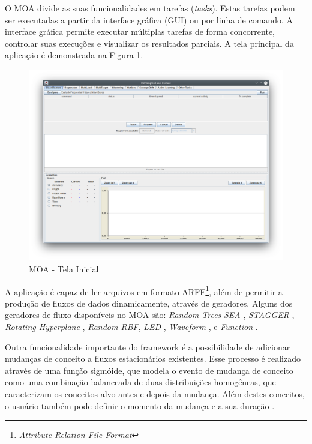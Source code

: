 \documentclass[msc, classic, a4paper]{ufbathesis}
\begin{document}
O MOA divide as suas funcionalidades em tarefas (\textit{tasks}).
Estas tarefas podem ser executadas a partir da interface gráfica (GUI) ou por linha de comando.
A interface gráfica permite executar múltiplas tarefas de forma concorrente,
controlar suas execuções e visualizar os resultados parciais.
A tela principal da aplicação é demonstrada na Figura \ref{fig:moa}.

\begin{figure}[H]
\begin{center}
    \includegraphics[scale=0.4]{imagens/moa.png}
    \caption{MOA - Tela Inicial}
    \label{fig:moa}
\end{center}
\end{figure}

A aplicação é capaz de ler arquivos em formato ARFF\footnote{\textit{Attribute-Relation File Format}}, além de permitir a produção de fluxos de dados dinamicamente, através de geradores.
Alguns dos geradores de fluxo disponíveis no MOA são:
\textit{Random Trees} \cite{Domingos:2000:MHD:347090.347107}
\textit{SEA} \cite{Street:2001:SEA:502512.502568},
\textit{STAGGER} \cite{Schlimmer1986},
\textit{Rotating Hyperplane} \cite{Wang:2003:MCD:956750.956778},
\textit{Random RBF},
\textit{LED} \cite{Gama:2003:ADT:956750.956813},
\textit{Waveform} \cite{Gama:2003:ADT:956750.956813},
 e \textit{Function} \cite{Jin:2003:EDT:956750.956821}.

Outra funcionalidade importante do framework é a possibilidade de adicionar mudanças de conceito a fluxos estacionários existentes.
Esse processo é realizado através de uma função sigmóide, que modela o evento de mudança de conceito como uma combinação balanceada de duas distribuições homogêneas,
que caracterizam os conceitos-alvo antes e depois da mudança.
Além destes conceitos, o usuário também pode definir o momento da mudança e a sua duração \cite{Bifet:2010:MMO:1756006.1859903}.
\end{document}
